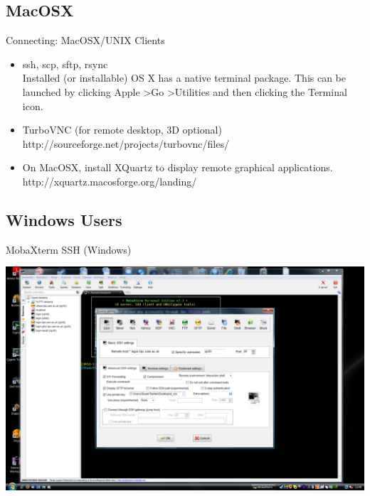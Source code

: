 \subsection{MacOSX}
\begin{frame}{Connecting: MacOSX/UNIX Clients}
\begin{itemize}
\item {\color<2->{red}ssh}, scp, sftp, {rsync}\hfill\\
\alert{\small Installed (or installable) OS X has a native terminal package. This can be launched by clicking Apple \textgreater Go \textgreater Utilities and then clicking the Terminal icon.}
\item<3-> TurboVNC \alert{\small (for remote desktop, 3D optional)}\hfill\\
\alert{\small http://sourceforge.net/projects/turbovnc/files/}
\item<4-> On MacOSX, install \alert{XQuartz} to display remote graphical applications.\hfill\\
\alert{\small http://xquartz.macosforge.org/landing/}
\end{itemize}
\end{frame}

\subsection{Windows Users}
\begin{frame}{MobaXterm SSH (Windows)}
\begin{center}
\centerline{\includegraphics[height=0.8\textheight]{imgs/mobaxterm-SSH-settings2.png}}
\end{center}
\end{frame}

